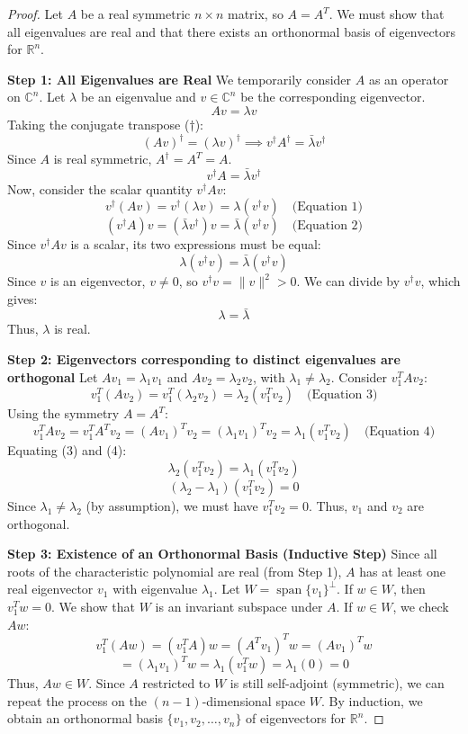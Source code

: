 \documentclass{article}
\begin{document}
\begin{proof}
    
    Let $A$ be a real symmetric $n \times n$ matrix, so $A = A^T$. We must show that all eigenvalues are real and that there exists an orthonormal basis of eigenvectors for $\mathbb{R}^n$.

    \noindent \textbf{Step 1: All Eigenvalues are Real}
    We temporarily consider $A$ as an operator on $\mathbb{C}^n$. Let $\lambda$ be an eigenvalue and $v \in \mathbb{C}^n$ be the corresponding eigenvector.
    $$ A v = \lambda v $$
    Taking the conjugate transpose ($\dagger$):
    $$ (A v)^\dagger = (\lambda v)^\dagger \implies v^\dagger A^\dagger = \bar{\lambda} v^\dagger $$
    Since $A$ is real symmetric, $A^\dagger = A^T = A$.
    $$ v^\dagger A = \bar{\lambda} v^\dagger $$
    Now, consider the scalar quantity $v^\dagger A v$:
    $$ v^\dagger (A v) = v^\dagger (\lambda v) = \lambda (v^\dagger v) \quad \text{(Equation 1)} $$
    $$ (v^\dagger A) v = (\bar{\lambda} v^\dagger) v = \bar{\lambda} (v^\dagger v) \quad \text{(Equation 2)} $$
    Since $v^\dagger A v$ is a scalar, its two expressions must be equal:
    $$ \lambda (v^\dagger v) = \bar{\lambda} (v^\dagger v) $$
    Since $v$ is an eigenvector, $v \ne 0$, so $v^\dagger v = \|v\|^2 > 0$. We can divide by $v^\dagger v$, which gives:
    $$ \lambda = \bar{\lambda} $$
    Thus, $\lambda$ is real.

    \noindent \textbf{Step 2: Eigenvectors corresponding to distinct eigenvalues are orthogonal}
    Let $A v_1 = \lambda_1 v_1$ and $A v_2 = \lambda_2 v_2$, with $\lambda_1 \ne \lambda_2$.
    Consider $v_1^T A v_2$:
    $$ v_1^T (A v_2) = v_1^T (\lambda_2 v_2) = \lambda_2 (v_1^T v_2) \quad \text{(Equation 3)} $$
    Using the symmetry $A = A^T$:
    $$ v_1^T A v_2 = v_1^T A^T v_2 = (A v_1)^T v_2 = (\lambda_1 v_1)^T v_2 = \lambda_1 (v_1^T v_2) \quad \text{(Equation 4)} $$
    Equating (3) and (4):
    $$ \lambda_2 (v_1^T v_2) = \lambda_1 (v_1^T v_2) $$
    $$ (\lambda_2 - \lambda_1) (v_1^T v_2) = 0 $$
    Since $\lambda_1 \ne \lambda_2$ (by assumption), we must have $v_1^T v_2 = 0$.
    Thus, $v_1$ and $v_2$ are orthogonal.

    \noindent \textbf{Step 3: Existence of an Orthonormal Basis (Inductive Step)}
    Since all roots of the characteristic polynomial are real (from Step 1), $A$ has at least one real eigenvector $v_1$ with eigenvalue $\lambda_1$.
    Let $W = \operatorname{span}\{v_1\}^{\perp}$. If $w \in W$, then $v_1^T w = 0$.
    We show that $W$ is an invariant subspace under $A$. If $w \in W$, we check $A w$:
    $$ v_1^T (A w) = (v_1^T A) w = (A^T v_1)^T w = (A v_1)^T w $$
    $$ = (\lambda_1 v_1)^T w = \lambda_1 (v_1^T w) = \lambda_1 (0) = 0 $$
    Thus, $A w \in W$. Since $A$ restricted to $W$ is still self-adjoint (symmetric), we can repeat the process on the $(n-1)$-dimensional space $W$.
    By induction, we obtain an orthonormal basis $\{v_1, v_2, \dots, v_n\}$ of eigenvectors for $\mathbb{R}^n$.
\end{proof}
\end{document}

